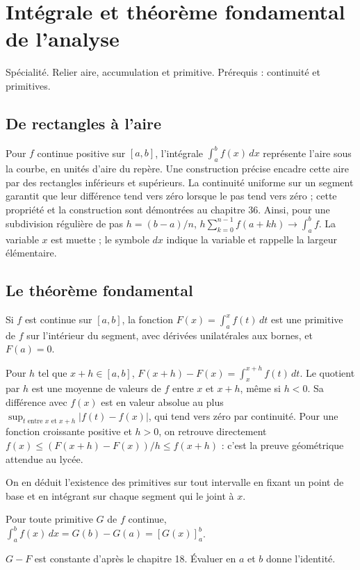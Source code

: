 \documentclass[../cours_tle.tex]{subfiles}
\begin{document}
\setcounter{chapter}{18}
\chapter{Intégrale et théorème fondamental de l’analyse}
\label{ch:19}
\begin{objectif}
Spécialité. Relier aire, accumulation et primitive. Prérequis : continuité et primitives.
\end{objectif}
\section{De rectangles à l'aire}
Pour $f$ continue positive sur $[a,b]$, l'intégrale $\int_a^b f(x)\,dx$ représente l'aire sous la courbe, en unités d'aire du repère.
Une construction précise encadre cette aire par des rectangles inférieurs et supérieurs. La continuité uniforme sur un segment garantit que leur différence tend vers zéro lorsque le pas tend vers zéro ; cette propriété et la construction sont démontrées au chapitre 36.
Ainsi, pour une subdivision régulière de pas $h=(b-a)/n$,
$h\sum_{k=0}^{n-1}f(a+kh)\to\int_a^b f$.
La variable $x$ est muette ; le symbole $dx$ indique la variable et rappelle la largeur élémentaire.
\section{Le théorème fondamental}
\begin{theoreme}
Si $f$ est continue sur $[a,b]$, la fonction $F(x)=\int_a^x f(t)\,dt$ est une primitive de $f$ sur l'intérieur du segment, avec dérivées unilatérales aux bornes, et $F(a)=0$.
\end{theoreme}
\begin{demonstration}
Pour $h$ tel que $x+h\in[a,b]$,
$F(x+h)-F(x)=\int_x^{x+h}f(t)\,dt$.
Le quotient par $h$ est une moyenne de valeurs de $f$ entre $x$ et $x+h$, même si $h<0$. Sa différence avec $f(x)$ est en valeur absolue au plus
$\sup_{t\text{ entre }x\text{ et }x+h}|f(t)-f(x)|$, qui tend vers zéro par continuité.
Pour une fonction croissante positive et $h>0$, on retrouve directement
$f(x)\le(F(x+h)-F(x))/h\le f(x+h)$ : c'est la preuve géométrique attendue au lycée.
\end{demonstration}
On en déduit l'existence des primitives sur tout intervalle en fixant un point de base et en intégrant sur chaque segment qui le joint à $x$.
\begin{theoreme}
Pour toute primitive $G$ de $f$ continue,
$\displaystyle\int_a^b f(x)\,dx=G(b)-G(a)=[G(x)]_a^b$.
\end{theoreme}
\begin{demonstration}
$G-F$ est constante d'après le chapitre 18. Évaluer en $a$ et $b$ donne l'identité.
\end{demonstration}
\end{document}
